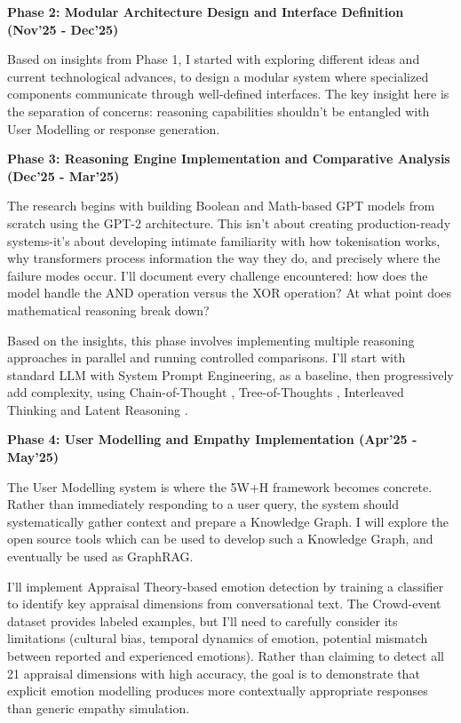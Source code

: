 \documentclass[a4paper,oneside,12pt]{book}
\numberwithin{equation}{chapter} %
\begin{document}
\textbf{Phase 2: Modular Architecture Design and Interface Definition (Nov'25 - Dec'25)}

Based on insights from Phase 1, I started with exploring different ideas and current technological advances, to design a modular system where specialized components communicate through well-defined interfaces. The key insight here is the separation of concerns: reasoning capabilities shouldn't be entangled with User Modelling or response generation.

\textbf{Phase 3: Reasoning Engine Implementation and Comparative Analysis (Dec'25 - Mar'25)}

The research begins with building Boolean and Math-based GPT models from scratch using the GPT-2 architecture. This isn't about creating production-ready systems-it's about developing intimate familiarity with how tokenisation works, why transformers process information the way they do, and precisely where the failure modes occur. I'll document every challenge encountered: how does the model handle the AND operation versus the XOR operation? At what point does mathematical reasoning break down? 

Based on the insights, this phase involves implementing multiple reasoning approaches in parallel and running controlled comparisons. I'll start with standard LLM with System Prompt Engineering, as a baseline, then progressively add complexity, using Chain-of-Thought \cite{wei2023chainofthoughtpromptingelicitsreasoning}, Tree-of-Thoughts \cite{yao2023treethoughtsdeliberateproblem}, Interleaved Thinking \cite{xie2025interleavedreasoninglargelanguage} and Latent Reasoning \cite{hao2025traininglargelanguagemodels}.

\textbf{Phase 4: User Modelling and Empathy Implementation (Apr'25 - May'25)}

The User Modelling system is where the 5W+H framework becomes concrete. Rather than immediately responding to a user query, the system should systematically gather context and prepare a Knowledge Graph. I will explore the open source tools which can be used to develop such a Knowledge Graph, and eventually be used as GraphRAG.

I'll implement Appraisal Theory-based emotion detection \cite{debnath-etal-2025-appraisal} by training a classifier to identify key appraisal dimensions from conversational text. The Crowd-event dataset provides labeled examples, but I'll need to carefully consider its limitations (cultural bias, temporal dynamics of emotion, potential mismatch between reported and experienced emotions). Rather than claiming to detect all 21 appraisal dimensions with high accuracy, the goal is to demonstrate that explicit emotion modelling produces more contextually appropriate responses than generic empathy simulation.
\end{document}
